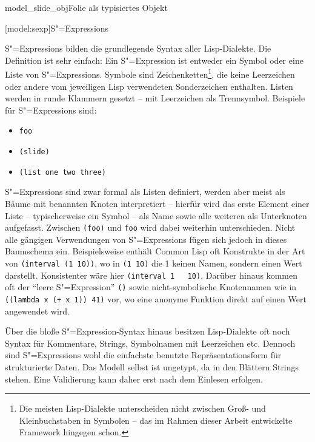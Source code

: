 \documentclass[12pt, a4paper, bibgerm]{scrbook}
\newcommand\icode[1]{\lstinline?#1?}
\newcommand\lsection{}
\newcommand\fig{}
\newcommand{\sexp}{S"=Expression}
\newcommand{\sexps}{S"=Expressions}
\begin{document}
\fig{model_slide_obj}{Folie als typisiertes Objekt}

\lsection[model:sexp]{\sexps}

\sexps{} bilden die grundlegende Syntax aller Lisp-Dialekte. Die
Definition ist sehr einfach: Ein \sexp{} ist entweder ein Symbol oder
eine Liste von \sexps{}. Symbole sind Zeichenketten\footnote{Die meisten
  Lisp-Dialekte unterscheiden nicht zwischen Groß- und Kleinbuchstaben
  in Symbolen -- das im Rahmen dieser Arbeit entwickelte Framework
  hingegen schon.}, die keine Leerzeichen oder andere vom jeweiligen Lisp
verwendeten Sonderzeichen enthalten. Listen werden in runde Klammern
gesetzt -- mit Leerzeichen als Trennsymbol. Beispiele für \sexps{} sind:
\begin{itemize}
\item \icode{foo}
\item \icode{(slide)}
\item \icode{(list one two three)}
\end{itemize}

\sexps{} sind zwar formal als Listen definiert, werden aber meist als
Bäume mit benannten Knoten interpretiert -- hierfür wird das erste
Element einer Liste -- typischerweise ein Symbol -- als Name sowie alle
weiteren als Unterknoten aufgefasst. Zwischen \icode{(foo)} und
\icode{foo} wird dabei weiterhin unterschieden. Nicht alle gängigen
Verwendungen von \sexps{} fügen sich jedoch in dieses Baumschema
ein. Beispielsweise enthält Common Lisp oft Konstrukte in der Art von
\icode{(interval (1 10))}, wo in \icode{(1 10)} die 1 keinen Namen,
sondern einen Wert darstellt. Konsistenter wäre hier \icode{(interval 1
  10)}. Darüber hinaus kommen oft der "`leere \sexp{}"' \icode{()} sowie
nicht-symbolische Knotennamen wie in \icode{((lambda x (+ x 1)) 41)}
vor, wo eine anonyme Funktion direkt auf einen Wert angewendet wird.

Über die bloße \sexp{}-Syntax hinaus besitzen Lisp-Dialekte oft noch
Syntax für Kommentare, Strings, Symbolnamen mit Leerzeichen
etc. Dennoch sind \sexps{} wohl die einfachste benutzte
Repräsentationsform für strukturierte Daten. Das Modell selbst ist
ungetypt, da in den Blättern Strings stehen. Eine Validierung kann
daher erst nach dem Einlesen erfolgen.
\end{document}
